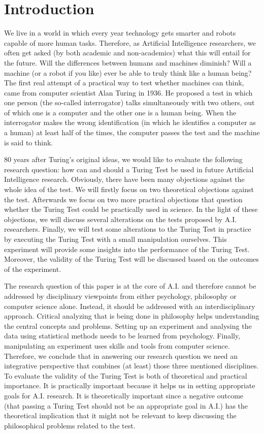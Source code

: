 \section{Introduction}
We live in a world in which every year technology gets smarter and robots capable of more human tasks. Therefore, as Artificial Intelligence researchers, we often get asked (by both academic and non-academics) what this will entail for the future. Will the differences between humans and machines diminish? Will a machine (or a robot if you like) ever be able to truly think like a human being? The first real attempt of a practical way to test whether machines can think, came from computer scientist Alan Turing in 1936. He proposed a test in which one person (the so-called interrogator) talks simultaneously with two others, out of which one is a computer and the other one is a human being. When the interrogator makes the wrong identification (in which he identifies a computer as a human) at least half of the times, the computer passes the test and the machine is said to think.

80 years after Turing's original ideas, we would like to evaluate the following research question: how can and should a Turing Test be used in future Artificial Intelligence research. Obviously, there have been many objections against the whole idea of the test. We will firstly focus on two theoretical objections against the test. Afterwards we focus on two more practical objections that question whether the Turing Test could be practically used in science. In the light of these objections, we will discuss several alterations on the tests proposed by A.I. researchers. Finally, we will test some alterations to the Turing Test in practice by executing the Turing Test with a small manipulation ourselves. This experiment will provide some insights into the performance of the Turing Test. Moreover, the validity of the Turing Test will be discussed based on the outcomes of the experiment.

The research question of this paper is at the core of A.I. and therefore cannot be addressed by disciplinary viewpoints from either psychology, philosophy or computer science alone. Instead, it should be addressed with an interdisciplinary approach. Critical analyzing that is being done in philosophy helps understanding the central concepts and problems. Setting up an experiment and analysing the data using statistical methods needs to be learned from psychology. Finally, manipulating an experiment uses skills and tools from computer science. Therefore, we conclude that in answering our research question we need an integrative perspective that combines (at least) those three mentioned disciplines. To evaluate the validity of the Turing Test is both of theoretical and practical importance. It is practically important because it helps us in setting appropriate goals for A.I. research. It is theoretically important since a negative outcome (that passing a Turing Test should not be an appropriate goal in A.I.) has the theoretical implication that it might not be relevant to keep discussing the philosophical problems related to the test.

